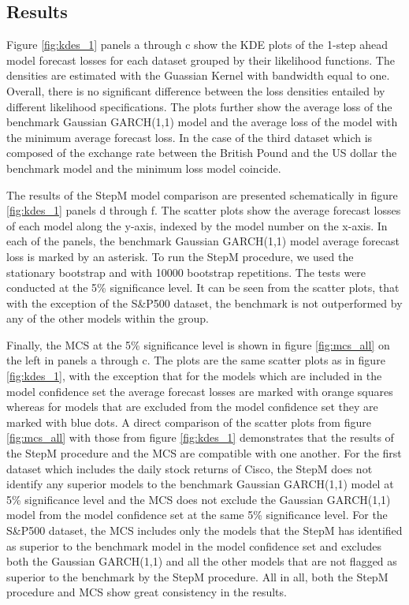 \documentclass{article} %
\begin{document}
	\subsection{Results}
	Figure \ref{fig:kdes_1} panels a through c show the KDE plots of the 1-step ahead model forecast losses for each dataset grouped by their likelihood functions. The densities are estimated with the Guassian Kernel with bandwidth equal to one. Overall, there is no significant difference between the loss densities entailed by different likelihood specifications. The plots further show the average loss of the benchmark Gaussian GARCH(1,1) model and the average loss of the model with the minimum average forecast loss. In the case of the third dataset which is composed of the exchange rate between the British Pound and the US dollar the benchmark model and the minimum loss model coincide. 
	
	The results of the StepM model comparison are presented schematically in figure \ref{fig:kdes_1} panels d through f. The scatter plots show the average forecast losses of each model along the y-axis, indexed by the model number on the x-axis. In each of the panels, the benchmark Gaussian GARCH(1,1) model average forecast loss is marked by an asterisk. To run the StepM procedure, we used the stationary bootstrap and with 10000 bootstrap repetitions. The tests were conducted at the 5\% significance level. It can be seen from the scatter plots, that with the exception of the S\&P500 dataset, the benchmark is not outperformed by any of the other models within the group.
	
	Finally, the MCS at the 5\% significance level is shown in figure \ref{fig:mcs_all} on the left in panels a through c. The plots are the same scatter plots as in figure \ref{fig:kdes_1}, with the exception that for the models which are included in the model confidence set the average forecast losses are marked with orange squares whereas for models that are excluded from the model confidence set they are marked with blue dots. A direct comparison of the scatter plots from figure \ref{fig:mcs_all} with those from figure \ref{fig:kdes_1} demonstrates that the results of the StepM procedure and the MCS are compatible with one another. For the first dataset which includes the daily stock returns of Cisco, the StepM does not identify any superior models to the benchmark Gaussian GARCH(1,1) model at 5\% significance level and the MCS does not exclude the Gaussian GARCH(1,1) model from the model confidence set at the same 5\% significance level. For the S\&P500 dataset, the MCS includes only the models that the StepM has identified as superior to the benchmark model in the model confidence set and excludes both the Gaussian GARCH(1,1) and all the other models that are not flagged as superior to the benchmark by the StepM procedure. All in all, both the StepM procedure and MCS show great consistency in the results.
	
\end{document}
